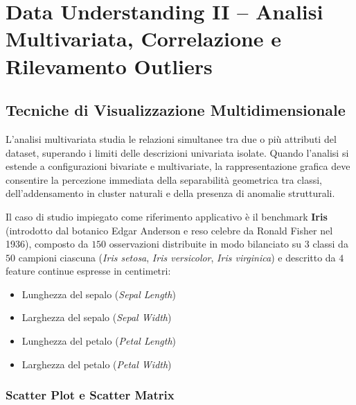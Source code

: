 \chapter{Data Understanding II -- Analisi Multivariata, Correlazione e Rilevamento Outliers}
\label{chap:dm-data-understanding-multivariate-outliers}

\FloatBarrier
\section{Tecniche di Visualizzazione Multidimensionale}
\label{sec:dm-multivariate-visualization}

L'analisi multivariata studia le relazioni simultanee tra due o più attributi del dataset, superando i limiti delle descrizioni univariata isolate. Quando l'analisi si estende a configurazioni bivariate e multivariate, la rappresentazione grafica deve consentire la percezione immediata della separabilità geometrica tra classi, dell'addensamento in cluster naturali e della presenza di anomalie strutturali.

Il caso di studio impiegato come riferimento applicativo è il benchmark \textbf{Iris} (introdotto dal botanico Edgar Anderson e reso celebre da Ronald Fisher nel 1936), composto da $150$ osservazioni distribuite in modo bilanciato su $3$ classi da $50$ campioni ciascuna (\textit{Iris setosa}, \textit{Iris versicolor}, \textit{Iris virginica}) e descritto da $4$ feature continue espresse in centimetri:
\begin{itemize}[noitemsep]
    \item Lunghezza del sepalo (\textit{Sepal Length})
    \item Larghezza del sepalo (\textit{Sepal Width})
    \item Lunghezza del petalo (\textit{Petal Length})
    \item Larghezza del petalo (\textit{Petal Width})
\end{itemize}

\FloatBarrier
\subsection{Scatter Plot e Scatter Matrix}

